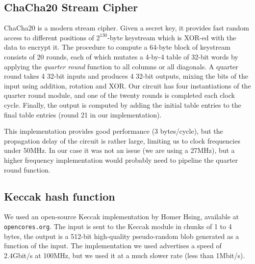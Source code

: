 \subsection{ChaCha20 Stream Cipher}\label{chacha20-stream-cipher}

ChaCha20 is a modern stream cipher. Given a secret key, it provides fast
random access to different positions of \(2^{130}\)-byte keystream which
is XOR-ed with the data to encrypt it. The procedure to compute a
64-byte block of keystream consists of 20 rounds, each of which mutates
a 4-by-4 table of 32-bit words by applying the \emph{quarter round}
function to all columns or all diagonals. A quarter round takes 4 32-bit
inputs and produces 4 32-bit outputs, mixing the bits of the input using
addition, rotation and XOR. Our circuit has four instantiations of the
quarter round module, and one of the twenty rounds is completed each
clock cycle. Finally, the output is computed by adding the initial table
entries to the final table entries (round 21 in our implementation).

This implementation provides good performance (3 bytes/cycle), but the
propagation delay of the circuit is rather large, limiting us to clock
frequencies under 50MHz. In our case it was not an issue (we are using a
27MHz), but a higher frequency implementation would probably need to
pipeline the quarter round function.

\subsection{Keccak hash function}\label{keccak-hash-function}

We used an open-source Keccak implementation by Homer Hsing, available
at \texttt{opencores.org}. The input is sent to the Keccak module in
chunks of 1 to 4 bytes, the output is a 512-bit high-quality
pseudo-random blob generated as a function of the input. The
implementation we used advertises a speed of 2.4Gbit/s at 100MHz, but we
used it at a much slower rate (less than 1Mbit/s).
